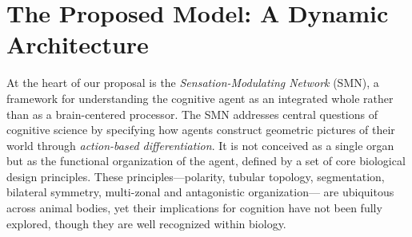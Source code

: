 
\section{The Proposed Model: A Dynamic Architecture}
\label{sec:model}

At the heart of our proposal is the \emph{Sensation-Modulating Network} (SMN), 
a framework for understanding the cognitive agent as an integrated whole rather than 
as a brain-centered processor. The SMN addresses central questions of cognitive science 
by specifying how agents construct geometric pictures of their world through 
\emph{action-based differentiation}. It is not conceived as a single organ but as the 
functional organization of the agent, defined by a set of core biological design principles. 
These principles—polarity, tubular topology, segmentation, bilateral symmetry, multi-zonal and antagonistic organization—
are ubiquitous across animal bodies, yet their implications 
for cognition have not been fully explored, though they are well recognized within biology.











%










